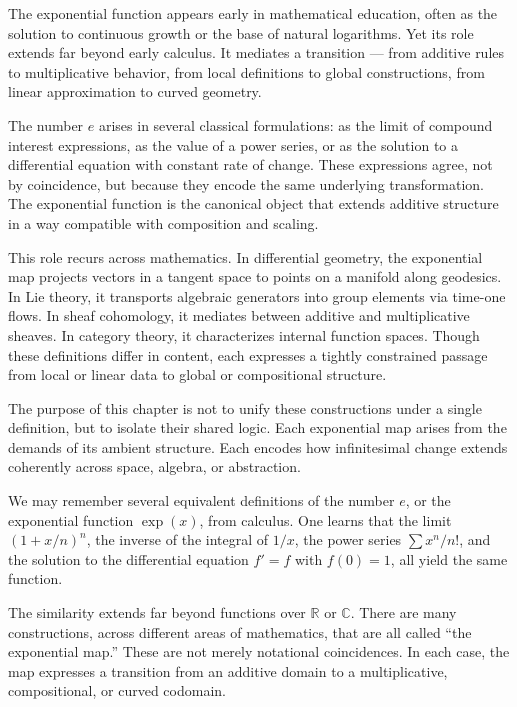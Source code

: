 The exponential function appears early in mathematical education, often as the solution to continuous growth or the base of natural logarithms. Yet its role extends far beyond early calculus. It mediates a transition — from additive rules to multiplicative behavior, from local definitions to global constructions, from linear approximation to curved geometry.

The number \( e \) arises in several classical formulations: as the limit of compound interest expressions, as the value of a power series, or as the solution to a differential equation with constant rate of change. These expressions agree, not by coincidence, but because they encode the same underlying transformation. The exponential function is the canonical object that extends additive structure in a way compatible with composition and scaling.

This role recurs across mathematics. In differential geometry, the exponential map projects vectors in a tangent space to points on a manifold along geodesics. In Lie theory, it transports algebraic generators into group elements via time-one flows. In sheaf cohomology, it mediates between additive and multiplicative sheaves. In category theory, it characterizes internal function spaces. Though these definitions differ in content, each expresses a tightly constrained passage from local or linear data to global or compositional structure.

The purpose of this chapter is not to unify these constructions under a single definition, but to isolate their shared logic. Each exponential map arises from the demands of its ambient structure. Each encodes how infinitesimal change extends coherently across space, algebra, or abstraction.

We may remember several equivalent definitions of the number \( e \), or the exponential function \( \exp(x) \), from calculus. One learns that the limit $\left(1 + x/n\right)^n$,
the inverse of the integral of \( 1/x \), the power series \( \sum x^n/n! \), and the solution to the differential equation \( f' = f \) with \( f(0) = 1 \), all yield the same function.

The similarity extends far beyond functions over \( \mathbb{R} \) or \( \mathbb{C} \). There are many constructions, across different areas of mathematics, that are all called “the exponential map.” These are not merely notational coincidences. In each case, the map expresses a transition from an additive domain to a multiplicative, compositional, or curved codomain.

